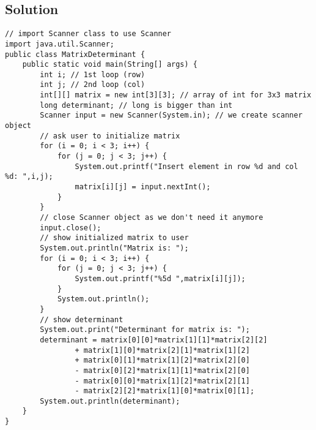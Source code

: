 \subsection*{Solution}
\lstset{language=Java,tabsize=2}
\begin{lstlisting}
// import Scanner class to use Scanner
import java.util.Scanner;
public class MatrixDeterminant {
	public static void main(String[] args) {
		int i; // 1st loop (row)
		int j; // 2nd loop (col)
		int[][] matrix = new int[3][3]; // array of int for 3x3 matrix
		long determinant; // long is bigger than int
		Scanner input = new Scanner(System.in); // we create scanner object
		// ask user to initialize matrix
		for (i = 0; i < 3; i++) {
			for (j = 0; j < 3; j++) {
				System.out.printf("Insert element in row %d and col %d: ",i,j);
				matrix[i][j] = input.nextInt();
			}
		}
		// close Scanner object as we don't need it anymore
		input.close();
		// show initialized matrix to user
		System.out.println("Matrix is: ");
		for (i = 0; i < 3; i++) {
			for (j = 0; j < 3; j++) {
				System.out.printf("%5d ",matrix[i][j]);
			}
			System.out.println();
		}
		// show determinant
		System.out.print("Determinant for matrix is: ");
		determinant = matrix[0][0]*matrix[1][1]*matrix[2][2]
				+ matrix[1][0]*matrix[2][1]*matrix[1][2]
				+ matrix[0][1]*matrix[1][2]*matrix[2][0]
				- matrix[0][2]*matrix[1][1]*matrix[2][0]
				- matrix[0][0]*matrix[1][2]*matrix[2][1]
				- matrix[2][2]*matrix[1][0]*matrix[0][1];
		System.out.println(determinant);		
	}
}
\end{lstlisting}